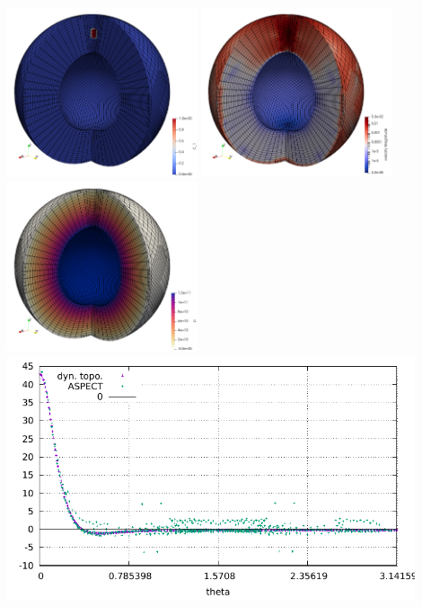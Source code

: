 \begin{center}
\includegraphics[width=5.6cm]{python_codes/fieldstone_152/RESULTS/exp2/aspect/mesh}
\includegraphics[width=5.6cm]{python_codes/fieldstone_152/RESULTS/exp2/aspect/vel}
\includegraphics[width=5.6cm]{python_codes/fieldstone_152/RESULTS/exp2/aspect/press}\\
\includegraphics[width=12cm]{python_codes/fieldstone_152/RESULTS/exp2/aspect/dynamic_topography.pdf}\\
\end{center}



